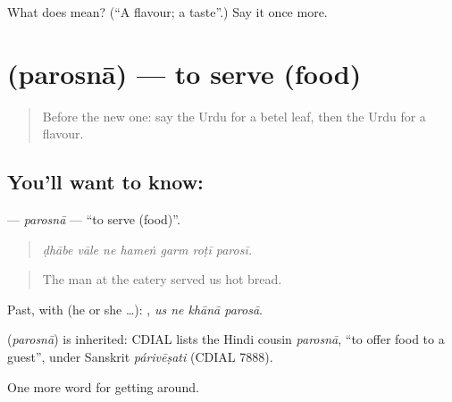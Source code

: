 \begin{tcolorbox}[breakable,colback=teal!4,colframe=teal!35!black,title={Before you move on}]
What does  mean? (\textquotedblleft{}A flavour; a taste\textquotedblright{}.) Say it once more.
\end{tcolorbox}
\section[\texorpdfstring{\ur{پروسنا} (parosnā)}{پروسنا (parosnā)}]{ (parosnā) — to serve (food)}

\label{lesson:UR-C415-parosna}



\begin{quote}
Before the new one: say the Urdu for a betel leaf, then the Urdu for a flavour.
\end{quote}

\subsection*{You'll want to know: }
\textbf{} — \emph{parosnā} — \textquotedblleft{}to serve (food)\textquotedblright{}.

\begin{quote}
      
\end{quote}

\begin{quote}
\emph{ḍhābe vāle ne hameṅ garm roṭī parosī.}
\end{quote}

\begin{quote}
The man at the eatery served us hot bread.
\end{quote}

Past, with  (he or she …):    , \emph{us ne khānā parosā}.

\begin{cousinweb}
\textbf{} (\emph{parosnā}) is inherited: CDIAL lists the Hindi cousin \emph{parosnā}, \textquotedblleft{}to offer food to a guest\textquotedblright{}, under Sanskrit \emph{párivēṣati} (CDIAL 7888).
\end{cousinweb}

\begin{grammarlens}[title={What you've built}]
One more word for getting around.
\end{grammarlens}

